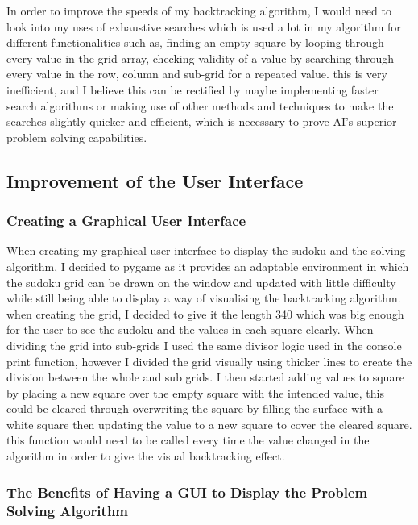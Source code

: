 \documentclass[]{final_report}
\begin{document}
In order to improve the speeds of my backtracking algorithm, I would need to look into my uses of exhaustive searches which is used a lot in my algorithm for different functionalities such as, finding an empty square by looping through every value in the grid array, checking validity of a value by searching through every value in the row, column and sub-grid for a repeated value. this is very inefficient, and I believe this can be rectified by maybe implementing faster search algorithms or making use of other methods and techniques to make the searches slightly quicker and efficient, which is necessary to prove AI's superior problem solving capabilities. 

\subsection*{Improvement of the User Interface}

\subsubsection{Creating a Graphical User Interface} 

When creating my graphical user interface to display the sudoku and the solving algorithm, I decided to pygame as it provides an adaptable environment in which the sudoku grid can be drawn on the window and updated with little difficulty while still being able to display a way of visualising the backtracking algorithm. when creating the grid, I decided to give it the length 340 which was big enough for the user to see the sudoku and the values in each square clearly. When dividing the grid into sub-grids I used the same divisor logic used in the console print function, however I divided the grid visually using thicker lines to create the division between the whole and sub grids. I then started adding values to square by placing a new square over the empty square with the intended value, this could be cleared through overwriting the square by filling the surface with a white square then updating the value to a new square to cover the cleared square. this function would need to be called every time the value changed in the algorithm in order to give the visual backtracking effect. 

\subsubsection{The Benefits of Having a GUI to Display the Problem Solving Algorithm} 
\end{document}
